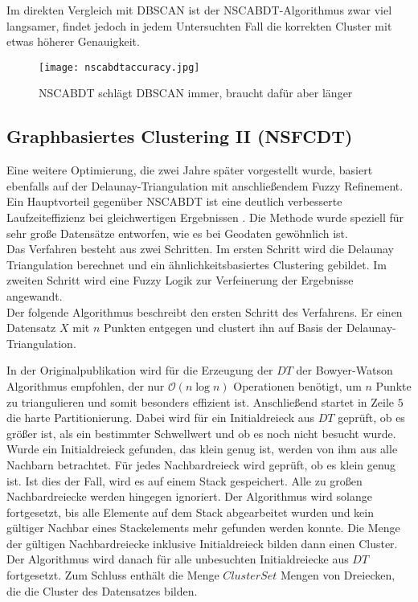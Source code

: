 \documentclass[11pt,ceqn]{book}
\begin{document}
\vspace{\belowdisplayskip}

Im direkten Vergleich mit DBSCAN ist der NSCABDT-Algorithmus zwar viel langsamer, findet jedoch in jedem Untersuchten Fall die korrekten Cluster mit etwas höherer Genauigkeit.
\begin{figure}[H]
\centering
\texttt{[image: nscabdtaccuracy.jpg]}
\caption{NSCABDT schlägt DBSCAN immer, braucht dafür aber länger}
\end{figure}



\clearpage
\vspace*{\fill}
\begin{center}
\begin{minipage}{1\textwidth}
\subsection{Graphbasiertes Clustering II (NSFCDT)}

Eine weitere Optimierung, die zwei Jahre später vorgestellt wurde, basiert ebenfalls auf der Delaunay-Triangulation mit anschließendem Fuzzy Refinement. Ein Hauptvorteil gegenüber NSCABDT ist eine deutlich verbesserte Laufzeiteffizienz bei gleichwertigen Ergebnissen \cite{nsfcdt}. Die Methode wurde speziell für sehr große Datensätze entworfen, wie es bei Geodaten gewöhnlich ist.\\

Das Verfahren besteht aus zwei Schritten. Im ersten Schritt wird die Delaunay Triangulation berechnet und ein ähnlichkeitsbasiertes Clustering gebildet. Im zweiten Schritt wird eine Fuzzy Logik zur Verfeinerung der Ergebnisse angewandt.\\


Der folgende Algorithmus beschreibt den ersten Schritt des Verfahrens. Er einen Datensatz $X$ mit $n$ Punkten entgegen und clustert ihn auf Basis der Delaunay-Triangulation.

In der Originalpublikation wird für die Erzeugung der $DT$ der Bowyer-Watson Algorithmus empfohlen, der nur $\mathcal{O}(n\log{}n)$ Operationen benötigt, um $n$ Punkte zu triangulieren und somit besonders effizient ist. Anschließend startet in Zeile $5$ die harte Partitionierung. Dabei wird für ein Initialdreieck aus $DT$ geprüft, ob es größer ist, als ein bestimmter Schwellwert und ob es noch nicht besucht wurde. Wurde ein Initialdreieck gefunden, das klein genug ist, werden von ihm aus alle Nachbarn betrachtet. Für jedes Nachbardreieck wird geprüft, ob es klein genug ist. Ist dies der Fall, wird es auf einem Stack gespeichert. Alle zu großen Nachbardreiecke werden hingegen ignoriert. Der Algorithmus wird solange fortgesetzt, bis alle Elemente auf dem Stack abgearbeitet wurden und kein gültiger Nachbar eines Stackelements mehr gefunden werden konnte. Die Menge der gültigen Nachbardreiecke inklusive Initialdreieck bilden dann einen Cluster. Der Algorithmus wird danach für alle unbesuchten Initialdreiecke aus $DT$ fortgesetzt. Zum Schluss enthält die Menge $ClusterSet$ Mengen von Dreiecken, die die Cluster des Datensatzes bilden.
\end{minipage}
\end{center}
\end{document}
